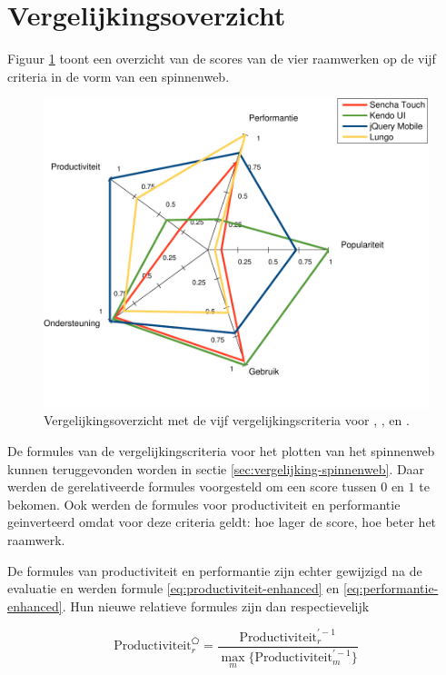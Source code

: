 \section{Vergelijkingsoverzicht}
\label{sec:evaluatie-spinnenweb}

Figuur \ref{fig:spinnenweb-final} toont een overzicht van de scores van de vier raamwerken op de vijf criteria in de vorm van een spinnenweb.

\begin{figure}[H]
  \centering
  \includegraphics[width=\textwidth]{figuren/spidergraph-final-nl.pdf}
  \caption{Vergelijkingsoverzicht met de vijf vergelijkingscriteria voor \st{},  \kendo{},  \jqm{} en \lungo{}.}
  \label{fig:spinnenweb-final}
\end{figure}

De formules van de vergelijkingscriteria voor het plotten van het spinnenweb kunnen teruggevonden worden in sectie \ref{sec:vergelijking-spinnenweb}.
Daar werden de gerelativeerde formules voorgesteld om een score tussen $0$ en $1$ te bekomen.
Ook werden de formules voor productiviteit en performantie geinverteerd omdat voor deze criteria geldt:  hoe lager de score, hoe beter het raamwerk.

De formules van productiviteit en performantie zijn echter gewijzigd na de evaluatie en werden formule \ref{eq:productiviteit-enhanced} en \ref{eq:performantie-enhanced}.
Hun nieuwe relatieve formules zijn dan respectievelijk

\begin{equation}
  \text{Productiviteit}_r^{\pentagon} = \frac{\text{Productiviteit}_r^{'-1}}{\underset{m}{\max}\{\text{Productiviteit}_m^{'-1}\}}
  \label{eq:rel-productiviteit-2}
\end{equation}

